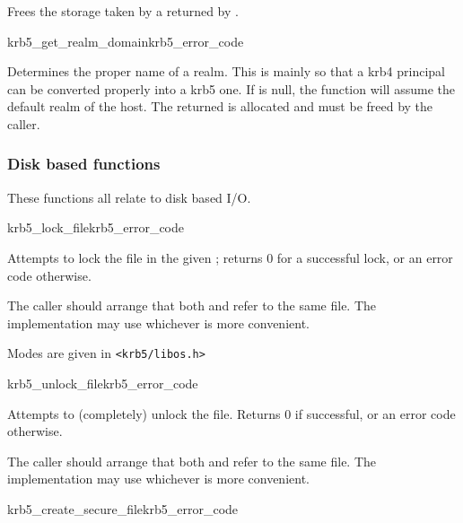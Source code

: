 Frees the storage taken by a  returned by
.

\begin{funcdecl}{krb5_get_realm_domain}{krb5_error_code}{\funcinout}
\funcin
{}
\funcout
{}
\end{funcdecl}

Determines the proper name of a realm. This is mainly so that a krb4
principal can be converted properly into a krb5 one. If
 is null, the function will assume the default realm of
the host. The returned  is allocated and must be
freed by the caller. 

\subsubsection{Disk based functions}
These functions all relate to disk based I/O.

\begin{funcdecl}{krb5_lock_file}{krb5_error_code}{\funcin}
\end{funcdecl}

Attempts to lock the file in the given ; returns 0 for a
successful lock, or an error code otherwise.

The caller should arrange that both  and
 refer to the same
file.  The implementation may use whichever is more convenient.

Modes are given in {\tt <krb5/libos.h>}


\begin{funcdecl}{krb5_unlock_file}{krb5_error_code}{\funcin}
\end{funcdecl}

Attempts to (completely) unlock the file.  Returns 0 if successful,
or an error code otherwise.

The caller should arrange that both  and
 refer to the same file.  The implementation may
use whichever is more convenient.

\begin{funcdecl}{krb5_create_secure_file}{krb5_error_code}{\funcin}
\end{funcdecl}

